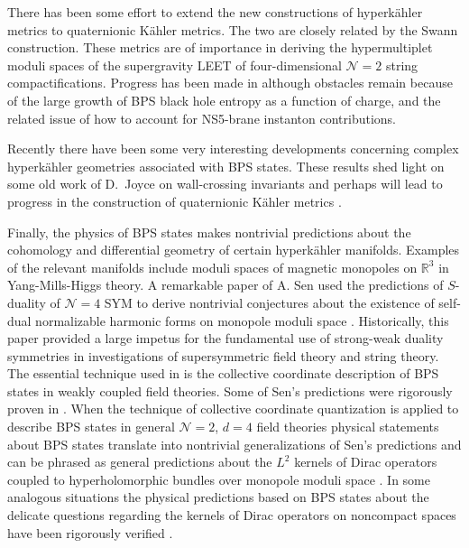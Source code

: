 \documentclass[12pt]{article}
\newcommand\CalN{\mathcal{N}}
\begin{document}
There has been some effort to extend the new constructions of
hyperk{\"a}hler metrics to quaternionic K{\"a}hler metrics. The two
are closely related by the Swann construction. These metrics
are of importance in deriving the hypermultiplet moduli spaces of
the supergravity LEET of four-dimensional ${\CalN}=2$ string compactifications.
Progress has been made in   
\cite{Alexandrov:2008gh,Alexandrov:2010qdt,Alexandrov:2010ca,Alexandrov:2011ac,Alexandrov:2012pr,Alexandrov:2013yva}
although obstacles remain because of the large growth of BPS black hole
entropy as a function of charge, and the related issue of how to account for NS5-brane instanton contributions. 
 

Recently there have been some very interesting developments
concerning complex hyperk{\"a}hler geometries associated with
BPS states. These results shed light on some old work of
D.~Joyce on wall-crossing invariants and perhaps will
lead to progress in the construction of quaternionic
K{\"a}hler metrics \cite{Alexandrov:2021prq,Alexandrov:2021wxu,Alim:2021gtw,Alim:2021mhp,Bridgeland:2019fbi,Bridgeland:2020zjh}.


Finally, the physics of BPS states makes nontrivial predictions 
about the cohomology and differential geometry of certain hyperk{\"a}hler 
manifolds. Examples of the relevant manifolds include moduli spaces of magnetic 
monopoles on $\mathbb{R}^3$ in Yang-Mills-Higgs theory. A remarkable 
paper of A. Sen used the predictions of $S$-duality of ${\CalN}=4$ SYM to derive 
nontrivial conjectures about the existence of self-dual normalizable harmonic forms on monopole moduli space \cite{Sen:1994yi}. Historically, this paper provided a large impetus for the fundamental use of strong-weak duality symmetries in investigations of supersymmetric field theory and string theory. The essential technique used in \cite{Sen:1994yi} is the collective coordinate description of BPS states in weakly coupled field theories. 
Some of Sen's predictions were rigorously proven in \cite{Segal:1996eb}.  
When the technique of collective coordinate quantization is applied 
to describe BPS states in general ${\CalN}=2$, $d=4$ field theories physical 
statements about BPS states translate into nontrivial generalizations of 
Sen's predictions and can be phrased as general predictions about the $L^2$ kernels of Dirac operators coupled to hyperholomorphic bundles over monopole moduli space \cite{Gauntlett:1995fu,Moore:2015qyu}. In some analogous situations the physical predictions based on BPS states about the delicate questions regarding the kernels of Dirac operators on noncompact spaces have been rigorously verified \cite{Sethi:1997pa}. 
\end{document}
